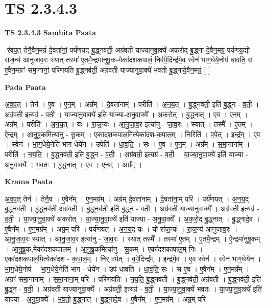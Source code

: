 \documentclass[17pt]{extarticle}
\begin{document}
\section*{ TS 2.3.4.3 }

\textbf{TS 2.3.4.3 } \newline
\textbf{Samhita Paata} \newline

-र॑वप॒त् तेनै॒वैन॒मग्रं॑ दे॒वता॑नां॒ पर्य॑णयद् बु॒द्ध्नव॑ती॒ अग्र॑वती याज्यानुवा॒क्ये॑ अकरोद् बु॒द्ध्ना-दे॒वैन॒मग्रं॒ पर्य॑णय॒द्यो रा॑ज॒न्य॑ आनुजाव॒रः स्यात् तस्मा॑ ए॒तमै॒न्द्रमा॑नुषू॒क-मेका॑दशकपालं॒ निर्व॑पे॒दिन्द्र॑मे॒व स्वेन॑ भाग॒धेये॒नोप॑ धावति॒ स ए॒वैन॒मग्रꣳ॑ समा॒नानां॒ परि॑णयति बु॒द्ध्नव॑ती॒ अग्र॑वती याज्यानुवा॒क्ये॑ भवतो बु॒द्ध्नादे॒वैन॒मग्रं॒ [  ] \newline

\textbf{Pada Paata} \newline

अ॒व॒प॒त् । तेन॑ । ए॒व । ए॒न॒म् । अग्र᳚म् । दे॒वता॑नाम् । परीति॑ । अ॒न॒य॒त् । बु॒द्ध्नव॑ती॒ इति॑ बु॒द्ध्न - व॒ती॒ । अग्र॑वती॒ इत्यग्र॑ - व॒ती॒ । या॒ज्या॒नु॒वा॒क्ये॑ इति॑ याज्या-अ॒नु॒वा॒क्ये᳚ । अ॒क॒रो॒त् । बु॒द्ध्नात् । ए॒व । ए॒न॒म् । अग्र᳚म् । परीति॑ । अ॒न॒य॒त् । यः । रा॒ज॒न्यः॑ । आ॒नु॒जा॒व॒र इत्या॑नु - जा॒व॒रः । स्यात् । तस्मै᳚ । ए॒तम् । ऐ॒न्द्रम् । आ॒नु॒षू॒कमित्या॑नु - सू॒कम् । एका॑दशकपाल॒मित्येका॑दश-क॒पा॒ल॒म् । निरिति॑ । व॒पे॒त् । इन्द्र᳚म् । ए॒व । स्वेन॑ । भा॒ग॒धेये॒नेति॑ भाग-धेये॑न । उपेति॑ । धा॒व॒ति॒ । सः । ए॒व । ए॒न॒म् । अग्र᳚म् । स॒मा॒नाना᳚म् । परीति॑ । न॒य॒ति॒ । बु॒द्ध्नव॑ती॒ इति॑ बु॒द्ध्न - व॒ती॒ । अग्र॑वती॒ इत्यग्र॑ - व॒ती॒ । या॒ज्या॒नु॒वा॒क्ये॑ इति॑ याज्या - अ॒नु॒वा॒क्ये᳚ । भ॒व॒तः॒ । बु॒द्ध्नात् । ए॒व । ए॒न॒म् । अग्र᳚म् ।  \newline


\textbf{Krama Paata} \newline

अ॒व॒प॒त् तेन॑ । तेनै॒व । ए॒वैन᳚म् । ए॒न॒मग्र᳚म् । अग्र॑म् दे॒वता॑नाम् । दे॒वता॑ना॒म् परि॑ । पर्य॑णयत् । अ॒न॒य॒द् बु॒द्ध्नव॑ती । बु॒द्ध्नव॑ती॒ अग्र॑वती । बु॒द्ध्नव॑ती॒ इति॑ बु॒द्ध्न - व॒ती॒ । अग्र॑वती याज्यानुवा॒क्ये᳚ । अग्र॑वती॒ इत्यग्र॑ - व॒ती॒ । या॒ज्या॒नु॒वा॒क्ये॑ अकरोत् । या॒ज्या॒नु॒वा॒क्ये॑ इति॑ याज्या - अ॒नु॒वा॒क्ये᳚ । अ॒क॒रो॒द् बु॒द्ध्नात् । बु॒द्ध्नादे॒व । ए॒वैन᳚म् । ए॒न॒मग्र᳚म् । अग्र॒म् परि॑ । पर्य॑णयत् । अ॒न॒य॒द् यः । यो रा॑ज॒न्यः॑ । रा॒ज॒न्य॑ आनुजाव॒रः । आ॒नु॒जा॒व॒रः स्यात् । आ॒नु॒जा॒व॒र इत्या॑नु - जा॒व॒रः । स्यात् तस्मै᳚ । तस्मा॑ ए॒तम् । ए॒तमै॒न्द्रम् । ऐ॒न्द्रमा॑नुषू॒कम् । आ॒नु॒षू॒क,मेका॑दशकपालम् । आ॒नु॒षू॒कमित्या॑नु - सू॒कम् । एका॑दशकापाल॒म् निः । एका॑दशकपाल॒मित्येका॑दश - क॒पा॒ल॒म् । निर् व॑पेत् । व॒पे॒दिन्द्र᳚म् । इन्द्र॑मे॒व । ए॒व स्वेन॑ । स्वेन॑ भाग॒धेये॑न । भा॒ग॒धेये॒नोप॑ । भा॒ग॒धेये॒नेति॑ भाग - धेये॑न । उप॑ धावति । धा॒व॒ति॒ सः । स ए॒व । ए॒वैन᳚म् । ए॒न॒मग्र᳚म् । अग्रꣳ॑ समा॒नाना᳚म् । स॒मा॒नाना॒म् परि॑ । परि॑णयति । न॒य॒ति॒ बु॒द्ध्नव॑ती । बु॒द्ध्नव॑ती॒ अग्र॑वती । बु॒द्ध्नव॑ती॒ इति॑ बु॒द्ध्न - व॒ती॒ । अग्र॑वती याज्यानुवा॒क्ये᳚ । अग्र॑वती॒ इत्यग्र॑ - व॒ती॒ । या॒ज्या॒नु॒वा॒क्ये॑ भवतः । या॒ज्या॒नु॒वा॒क्ये॑ इति॑ याज्या - अ॒नु॒वा॒क्ये᳚ । भ॒व॒तो॒ बु॒द्ध्नात् । बु॒द्ध्नादे॒व । ए॒वैन᳚म् । ए॒न॒मग्र᳚म् । अग्र॒म् परि॑ \newline
\end{document}
